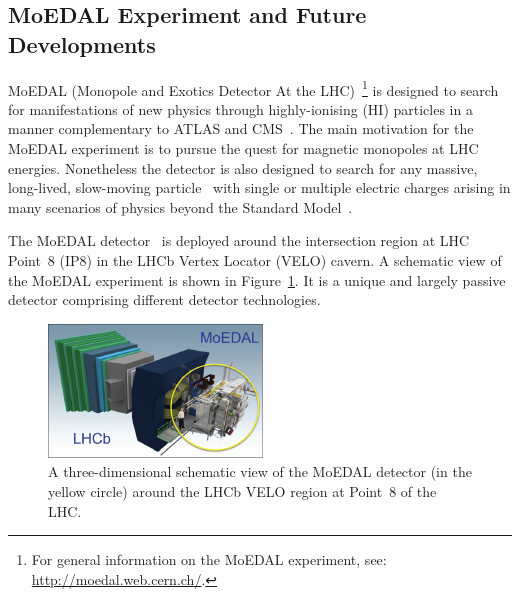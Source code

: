 \subsection{MoEDAL Experiment and Future Developments}
\label{sec:MoEDAL}



MoEDAL (Monopole and Exotics Detector At the LHC)~\cite{Pinfold:1181486}\footnote{For general information on the MoEDAL experiment, see: \url{http://moedal.web.cern.ch/}.} is designed to search for manifestations of new physics through highly-ionising (HI) particles in a manner complementary to ATLAS and CMS~\cite{DeRoeck:2011aa}. The main motivation for the MoEDAL experiment is to pursue the quest for magnetic monopoles at LHC energies. Nonetheless the detector is also designed to search for any massive, long-lived, slow-moving particle~\cite{Fairbairn:2006gg,Burdin:2014xma} with single or multiple electric charges arising in many scenarios of physics beyond the Standard Model~\cite{Acharya:2014nyr}.

The MoEDAL detector~\cite{MoEDAL:2016jlb} is deployed around the intersection region at LHC Point~8 (IP8) in the LHCb Vertex Locator (VELO) cavern. A schematic view of the MoEDAL experiment is shown in Figure~\ref{fg:moedal-lhcb}. It is a unique and largely passive detector comprising different detector technologies.

\begin{figure}[ht]
   \centering
   \includegraphics[width=0.9\linewidth]{plots/moedal-detector.pdf}
   \caption{A three-dimensional schematic view of the MoEDAL detector (in the yellow circle) around the LHCb VELO region at Point~8 of the LHC.}
   \label{fg:moedal-lhcb}
\end{figure}


